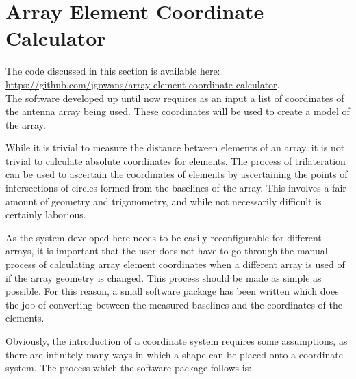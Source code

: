 \section{Array Element Coordinate Calculator}

The code discussed in this section is available here:\\
\url{https://github.com/jgowans/array-element-coordinate-calculator}.\\

The software developed up until now requires as an input a list of coordinates of the antenna array being used.
These coordinates will be used to create a model of the array.

While it is trivial to measure the distance between elements of an array, it is not trivial to calculate absolute coordinates for elements. The process of trilateration can be used to ascertain the coordinates of elements by ascertaining the points of intersections of circles formed from the baselines of the array.
This involves a fair amount of geometry and trigonometry, and while not necessarily difficult is certainly laborious.

As the system developed here needs to be easily reconfigurable for different arrays, it is important that the user does not have to go through the manual process of calculating array element coordinates when a different array is used of if the array geometry is changed.
This process should be made as simple as possible.
For this reason, a small software package has been written which does the job of converting between the measured baselines and the coordinates of the elements.

Obviously, the introduction of a coordinate system requires some assumptions, as there are infinitely many ways in which a shape can be placed onto a coordinate system. The process which the software package follows is:

